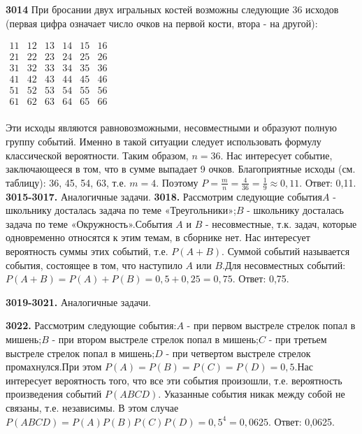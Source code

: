 \textbf{3014} При бросании двух игральных костей возможны следующие 36 исходов (первая цифра означает число очков на первой кости, втора - на другой):
\begin{center}$
\begin{matrix}
11& 12& 13& 14& 15& 16&\\
21& 22& 23& 24& 25& 26&\\
31& 32& 33& 34& 35& 36&\\
41& 42& 43& 44& 45& 46&\\
51& 52& 53& 54& 55& 56&\\
61& 62& 63& 64& 65& 66&\\
\end{matrix}$
\end{center}
Эти исходы являются равновозможными, несовместными и образуют полную группу событий. Именно в такой ситуации следует использовать формулу классической вероятности. Таким образом, $n=36.$
Нас интересует событие, заключающееся в том, что в сумме выпадает 9 очков. Благоприятные исходы (см. таблицу): 36, 45, 54, 63, т.е. $m=4$. Поэтому $P = \frac{m}{n}=\frac{4}{36}=\frac{1}{9}\approx0,11.$ \newline \null \hspace*{\fill} Ответ: 0,11. \newline
\textbf{3015-3017.} Аналогичные задачи.\newline
\textbf{3018.} Рассмотрим следующие события\newline$A$ - школьнику досталась задача по теме «Треугольники»;\newline$B$ - школьнику досталась задача по теме «Окружность».\newline События $A$ и $B$ - несовместные, т.к. задач, которые одновременно относятся к этим темам, в сборнике нет. Нас интересует вероятность суммы этих событий, т.е. $P(A+B)$. Суммой событий называется события, состоящее в том, что наступило $A$ или $B$.\newline Для несовместных событий: $P(A+B)=P(A)+P(B)=0,5+0,25=0,75.$\null \hspace*{\fill} Ответ: 0,75. 

\textbf{3019-3021.} Аналогичные задачи.

\textbf{3022.} Рассмотрим следующие события:\newline $A$ - при первом выстреле стрелок попал в мишень;\newline$B$ - при втором выстреле стрелок попал в мишень;\newline$C$ - при третьем выстреле стрелок попал в мишень;\newline$D$ - при четвертом выстреле стрелок промахнулся.\newline При этом $P(A)=P(B)=P(C)=P(D)=0,5.$\newline Нас интересует вероятность того, что все эти события произошли, т.е. вероятность произведения событий $P(ABCD)$. Указанные события никак между собой не связаны, т.е. независимы. В этом случае $P(ABCD)=P(A)P(B)P(C)P(D)=0,5^4=0,0625.$ \newline \null \hspace*{\fill} Ответ: 0,0625. 

